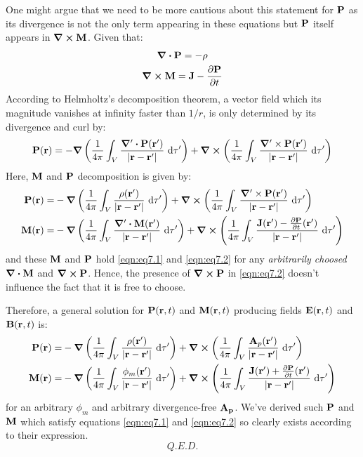 \documentclass{article}
\numberwithin{equation}{section}
\begin{document}
One might argue that we need to be more cautious about this statement for $\vb{P}$ as its divergence is not the only term appearing in these equations but $\vb{P}$ itself appears in $\curl\vb{M}$.
Given that:
\begin{gather}
\div\vb{P}=-\rho\label{eqn:eq7.1}\\\curl\vb{M}=\vb{J}-\frac{\partial\vb{P}}{\partial t}\label{eqn:eq7.2}
\end{gather}
According to Helmholtz's decomposition theorem, a vector field which its magnitude vanishes at infinity faster than $1/r$, is only determined by its divergence and curl by:
$$\vb{P}(\vb{r})=-\grad\left(\frac{1}{4\pi}\int_V\frac{\grad'\vdot\vb{P}(\vb{r}')}{|\vb{r}-\vb{r}'|}\ \dd\tau'\right)+\curl\left(\frac{1}{4\pi}\int_V\frac{\grad'\times\vb{P}(\vb{r'})}{|\vb{r}-\vb{r}'|}\ \dd\tau'\right)$$
Here, $\vb{M}$ and $\vb{P}$ decomposition is given by:
\begin{align}
\vb{P}(\vb{r})=&-\grad\left(\frac{1}{4\pi}\int_V\frac{\rho(\vb{r}')}{|\vb{r}-\vb{r}'|}\ \dd\tau'\right)+\curl\left(\frac{1}{4\pi}\int_V\frac{\grad'\times\vb{P}(\vb{r'})}{|\vb{r}-\vb{r}'|}\ \dd\tau'\right)\nonumber\\
\vb{M}(\vb{r})=&-\grad\left(\frac{1}{4\pi}\int_V\frac{\grad'\vdot\vb{M}(\vb{r}')}{|\vb{r}-\vb{r}'|}\ \dd\tau'\right)+\curl\left(\frac{1}{4\pi}\int_V\frac{\vb{J}(\vb{r}')-\frac{\partial\vb{P}}{\partial t}(\vb{r}')}{|\vb{r}-\vb{r}'|}\ \dd\tau'\right)\nonumber
\end{align}
 and these $\vb{M}$ and $\vb{P}$ hold \eqref{eqn:eq7.1} and \eqref{eqn:eq7.2} for any \textit{arbitrarily choosed} $\div\vb{M}$ and $\curl\vb{P}$. Hence, the presence of $\curl\vb{P}$ in \eqref{eqn:eq7.2} doesn't influence the fact that it is free to choose.

Therefore, a general solution for $\vb{P}(\vb{r},t)$ and $\vb{M}(\vb{r},t)$ producing fields $\vb{E}(\vb{r},t)$ and $\vb{B}(\vb{r},t)$ is:
\begin{align}
\vb{P}(\vb{r})=&-\grad\left(\frac{1}{4\pi}\int_V\frac{\rho(\vb{r}')}{|\vb{r}-\vb{r}'|}\ \dd\tau'\right)+\curl\left(\frac{1}{4\pi}\int_V\frac{\vb{A}_p(\vb{r'})}{|\vb{r}-\vb{r}'|}\ \dd\tau'\right)\nonumber\\
\vb{M}(\vb{r})=&-\grad\left(\frac{1}{4\pi}\int_V\frac{\phi_m(\vb{r}')}{|\vb{r}-\vb{r}'|}\ \dd\tau'\right)+\curl\left(\frac{1}{4\pi}\int_V\frac{\vb{J}(\vb{r}')+\frac{\partial\vb{P}}{\partial t}(\vb{r}')}{|\vb{r}-\vb{r}'|}\ \dd\tau'\right)\nonumber
\end{align}
for an arbitrary $\phi_m$ and arbitrary divergence-free $\vb{A_p}$. We've derived such $\vb{P}$ and $\vb{M}$ which satisfy equations \eqref{eqn:eq7.1} and \eqref{eqn:eq7.2} so clearly exists according to their expression.
$$Q. E. D. $$
\end{document}
